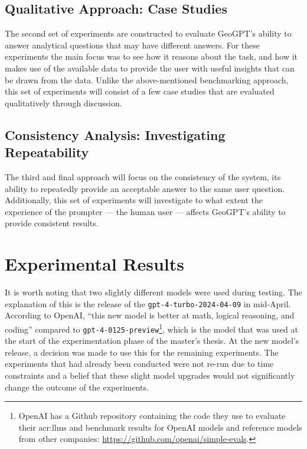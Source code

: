 \subsection{Qualitative Approach: Case Studies}

The second set of experiments are constructed to evaluate GeoGPT's ability to answer analytical questions that may have different answers. For these experiments the main focus was to see how it reasons about the task, and how it makes use of the available data to provide the user with useful insights that can be drawn from the data. Unlike the above-mentioned benchmarking approach, this set of experiments will consist of a few case studies that are evaluated qualitatively through discussion.

\subsection{Consistency Analysis: Investigating Repeatability}

The third and final approach will focus on the consistency of the system, its ability to repeatedly provide an acceptable answer to the same user question. Additionally, this set of experiments will investigate to what extent the experience of the prompter --- the human user --- affects GeoGPT's ability to provide consistent results.

\section{Experimental Results}
\label{sec:experimental-results}

It is worth noting that two slightly different models were used during testing. The explanation of this is the release of the \texttt{gpt-4-turbo-2024-04-09} in mid-April. According to OpenAI, \enquote{this new model is better at math, logical reasoning, and coding} compared to \texttt{gpt-4-0125-preview}\footnote{OpenAI has a Github repository containing the code they use to evaluate their \glspl{acr:llm} and benchmark results for OpenAI models and reference models from other companies: \url{https://github.com/openai/simple-evals}.}, which is the model that was used at the start of the experimentation phase of the master's thesis. At the new model's release, a decision was made to use this for the remaining experiments. The experiments that had already been conducted were not re-run due to time constraints and a belief that these slight model upgrades would not significantly change the outcome of the experiments.

